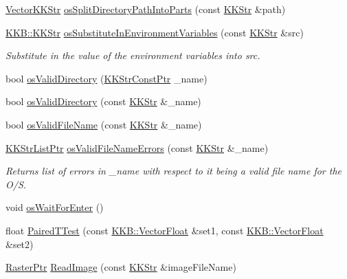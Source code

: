 \begin{DoxyCompactItemize}
\hyperlink{class_k_k_b_1_1_vector_k_k_str}{Vector\+K\+K\+Str} \hyperlink{namespace_k_k_b_a70fd84e089e329f2ae33471244b3e9f7}{os\+Split\+Directory\+Path\+Into\+Parts} (const \hyperlink{class_k_k_b_1_1_k_k_str}{K\+K\+Str} \&path)
\item 
\hyperlink{class_k_k_b_1_1_k_k_str}{K\+K\+B\+::\+K\+K\+Str} \hyperlink{namespace_k_k_b_a8f06168f97c35a03150eec763fb2c53e}{os\+Substitute\+In\+Environment\+Variables} (const \hyperlink{class_k_k_b_1_1_k_k_str}{K\+K\+Str} \&src)
\begin{DoxyCompactList}\small\item\em Substitute in the value of the environment variables into \textquotesingle{}src\textquotesingle{}. \end{DoxyCompactList}\item 
bool \hyperlink{namespace_k_k_b_a680994cc3187d4d7aa28c536ba8a3a88}{os\+Valid\+Directory} (\hyperlink{namespace_k_k_b_a46f665ec17615c856eff3d21f78bed5c}{K\+K\+Str\+Const\+Ptr} \+\_\+name)
\item 
bool \hyperlink{namespace_k_k_b_acdbd1907081535fe6e784d9f3adb24ba}{os\+Valid\+Directory} (const \hyperlink{class_k_k_b_1_1_k_k_str}{K\+K\+Str} \&\+\_\+name)
\item 
bool \hyperlink{namespace_k_k_b_a57e8630b9029529ca7d77bc52cb0717c}{os\+Valid\+File\+Name} (const \hyperlink{class_k_k_b_1_1_k_k_str}{K\+K\+Str} \&\+\_\+name)
\item 
\hyperlink{namespace_k_k_b_a8f5f50672f37857425120831223888aa}{K\+K\+Str\+List\+Ptr} \hyperlink{namespace_k_k_b_a5478eccda33ffeee9986061f58e3a130}{os\+Valid\+File\+Name\+Errors} (const \hyperlink{class_k_k_b_1_1_k_k_str}{K\+K\+Str} \&\+\_\+name)
\begin{DoxyCompactList}\small\item\em Returns list of errors in \textquotesingle{}\+\_\+name\textquotesingle{} with respect to it being a valid file name for the O/S. \end{DoxyCompactList}\item 
void \hyperlink{namespace_k_k_b_a255aa69aade7f429585349d08973e09f}{os\+Wait\+For\+Enter} ()
\item 
float \hyperlink{namespace_k_k_b_a42225840e0befbc9f4ee0dede2ff5946}{Paired\+T\+Test} (const \hyperlink{namespace_k_k_b_a4820c3670ee1fe74f0c4de981c600faf}{K\+K\+B\+::\+Vector\+Float} \&set1, const \hyperlink{namespace_k_k_b_a4820c3670ee1fe74f0c4de981c600faf}{K\+K\+B\+::\+Vector\+Float} \&set2)
\item 
\hyperlink{namespace_k_k_b_a80d46bd24db644a022c863bce8ae3633}{Raster\+Ptr} \hyperlink{namespace_k_k_b_ac16e808442fd255d2b7d09df8f11ae07}{Read\+Image} (const \hyperlink{class_k_k_b_1_1_k_k_str}{K\+K\+Str} \&image\+File\+Name)

\end{DoxyCompactItemize}
